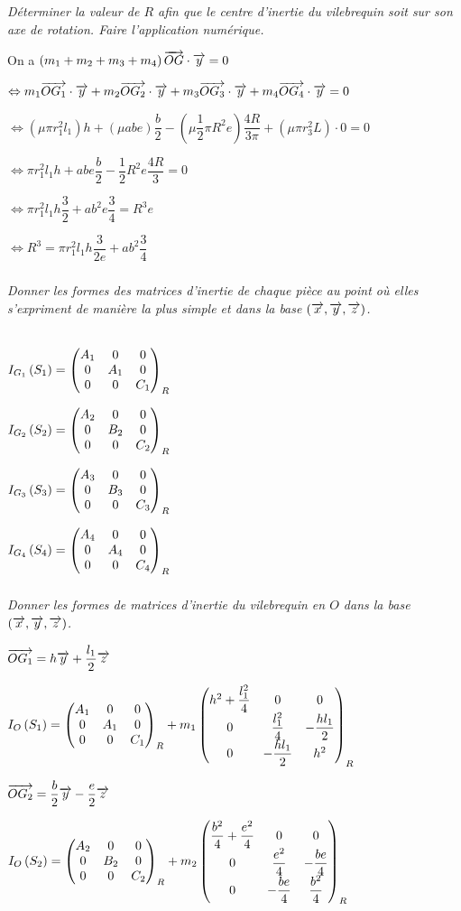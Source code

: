 \documentclass[10pt,fleqn]{article} %
\begin{document}
\begin{multicols}{2}
\subparagraph{}\textit{Déterminer la valeur de $R$ afin que le centre d’inertie du vilebrequin soit sur son axe de rotation. Faire l’application numérique.}

\begin{corrige}
On a $\left( m_1+m_2+m_3+m_4\right) \vect{OG}\cdot \vect{y}=0 $

$\Leftrightarrow m_1 \vect{OG_1}\cdot \vect{y}+m_2 \vect{OG_2}\cdot \vect{y}+m_3 \vect{OG_3}\cdot \vect{y}+m_4 \vect{OG_4}\cdot \vect{y} = 0$

$\Leftrightarrow \left(\mu \pi r_1^2 l_1\right) h+\left(\mu a b e\right) \dfrac{b}{2}-\left(\mu \dfrac{1}{2}\pi R^2 e\right) \dfrac{4R}{3\pi} +\left(\mu \pi r_3^2L\right) \cdot 0 = 0$


$\Leftrightarrow  \pi r_1^2 l_1 h+a b e \dfrac{b}{2}- \dfrac{1}{2} R^2 e \dfrac{4R}{3}  = 0$

$\Leftrightarrow  \pi r_1^2 l_1 h\dfrac{3}{2}+a b^2 e \dfrac{3}{4}=  R^3 e  $

$\Leftrightarrow   R^3 = \pi r_1^2 l_1 h\dfrac{3}{2e}+a b^2 \dfrac{3}{4}    $
\end{corrige}

\subparagraph{}\textit{Donner les formes des matrices d’inertie de chaque pièce au point où elles s’expriment de manière la plus simple et dans la base $\base{x}{y}{z}$.}
\begin{corrige} ~\\

$\inertie{G_1}{S_1}=\matinertie{A_1}{A_1}{C_1}{0}{0}{0}{R}$

$\inertie{G_2}{S_2}=\matinertie{A_2}{B_2}{C_2}{0}{0}{0}{R}$

$\inertie{G_3}{S_3}=\matinertie{A_3}{B_3}{C_3}{0}{0}{0}{R}$

$\inertie{G_4}{S_4}=\matinertie{A_4}{A_4}{C_4}{0}{0}{0}{R}$
\end{corrige}

\subparagraph{}\textit{Donner les formes de matrices d’inertie du vilebrequin en $O$ dans la base $\base{x}{y}{z}$.}

\begin{corrige}

$\vect{OG_1} = h\vect{y}+\dfrac{l_1}{2}\vect{z}$

$\inertie{O}{S_1}=\matinertie{A_1}{A_1}{C_1}{0}{0}{0}{R}
+m_1\matinertie{h^2+\dfrac{l_1^2}{4}}{\dfrac{l_1^2}{4}}{h^2}{-\dfrac{hl_1}{2}}{0}{0}{R}$

$\vect{OG_2} = \dfrac{b}{2}\vect{y}-\dfrac{e}{2}\vect{z}$

$\inertie{O}{S_2}=\matinertie{A_2}{B_2}{C_2}{0}{0}{0}{R}
+m_2\matinertie{\dfrac{b^2}{4}+\dfrac{e^2}{4}}{\dfrac{e^2}{4}}{\dfrac{b^2}{4}}{-\dfrac{be}{4}}{0}{0}{R}$


\end{corrige}
\end{multicols}
\end{document}
